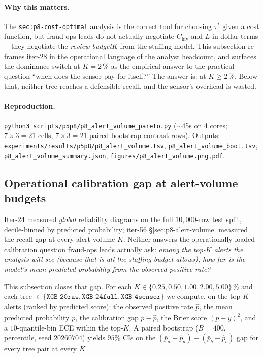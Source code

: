 \paragraph{Why this matters.}
The \texttt{sec:p8-cost-optimal} analysis is the correct tool for choosing
$\tau^{*}$ given a cost function, but fraud-ops leads do not actually
negotiate $C_{\text{inv}}$ and $L$ in dollar terms---they negotiate the
\emph{review budget}$K$ from the staffing model. This subsection
re-frames iter-28 in the operational language of the analyst headcount,
and surfaces the dominance-switch at $K{=}2\,\%$ as the empirical answer
to the practical question ``when does the sensor pay for itself?''
The answer is: at $K{\ge}2\,\%$. Below that, neither tree reaches a
defensible recall, and the sensor's overhead is wasted.

\paragraph{Reproduction.}
\texttt{python3 scripts/p5p8/p8\_alert\_volume\_pareto.py} ($\sim$45s on 4
cores; $7 \times 3 = 21$ cells, $7 \times 3 = 21$ paired-bootstrap
contrast rows). Outputs:
\texttt{experiments/results/p5p8/p8\_alert\_volume.tsv},
\texttt{p8\_alert\_volume\_boot.tsv},
\texttt{p8\_alert\_volume\_summary.json},
\texttt{figures/p8\_alert\_volume.{png,pdf}}.

\subsection{Operational calibration gap at alert-volume budgets}
\label{sec:p8-operational-calibration}

Iter-24  measured \emph{global} reliability
diagrams on the full $10{,}000$-row test split, decile-binned by predicted
probability; iter-56 \S\ref{sec:p8-alert-volume} measured the recall gap
at every alert-volume $K$. Neither answers the operationally-loaded
calibration question fraud-ops leads actually ask: \emph{among the
top-$K$ alerts the analysts will see (because that is all the staffing
budget allows), how far is the model's mean predicted probability from
the observed positive rate?}

This subsection closes that gap. For each $K \in \{0.25, 0.50, 1.00,
2.00, 5.00\}\,\%$ and each tree $\in \{\texttt{XGB-20raw},
\texttt{XGB-24full}, \texttt{XGB-4sensor}\}$ we compute, on the top-$K$
alerts (ranked by predicted score): the observed positive rate $\hat{p}$,
the mean predicted probability $\bar{p}$, the calibration gap
$\bar{p} - \hat{p}$, the Brier score $\overline{(\bar{p} - y)^2}$, and a
$10$-quantile-bin ECE within the top-$K$. A paired bootstrap
($B{=}400$, percentile, seed $20260704$) yields $95\%$ CIs on the
$(\bar{p}_a - \hat{p}_a) - (\bar{p}_b - \hat{p}_b)$ gap for every tree
pair at every $K$.

